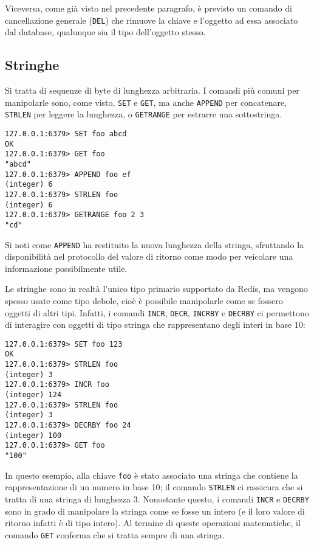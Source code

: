 Viceversa, come già visto nel precedente paragrafo, è previsto un comando di cancellazione
generale (\verb|DEL|) che rimuove la chiave e l'oggetto ad essa associato dal database,
qualunque sia il tipo dell'oggetto stesso.


\subsection{Stringhe}

Si tratta di sequenze di byte di lunghezza arbitraria. I comandi
più comuni per manipolarle sono, come visto, \verb|SET| e \verb|GET|, ma anche \verb|APPEND|
per concatenare, \verb|STRLEN| per leggere la lunghezza, o \verb|GETRANGE| per estrarre una
sottostringa.

\medskip
\begin{lstlisting}
127.0.0.1:6379> SET foo abcd
OK
127.0.0.1:6379> GET foo
"abcd"
127.0.0.1:6379> APPEND foo ef
(integer) 6
127.0.0.1:6379> STRLEN foo
(integer) 6
127.0.0.1:6379> GETRANGE foo 2 3
"cd"
\end{lstlisting}

Si noti come \verb|APPEND| ha restituito la nuova lunghezza della stringa, sfruttando
la disponibilità nel protocollo del valore di ritorno come modo per veicolare una
informazione possibilmente utile.

Le stringhe sono in realtà l'unico tipo primario supportato da Redis, ma vengono spesso usate come
tipo debole, cioè è possibile manipolarle come se fossero oggetti di altri tipi. Infatti, i comandi
\verb|INCR|, \verb|DECR|,  \verb|INCRBY| e \verb|DECRBY| ci permettono di interagire con oggetti di
tipo stringa che rappresentano degli interi in base 10:

\medskip
\begin{lstlisting}
127.0.0.1:6379> SET foo 123
OK
127.0.0.1:6379> STRLEN foo
(integer) 3
127.0.0.1:6379> INCR foo
(integer) 124
127.0.0.1:6379> STRLEN foo
(integer) 3
127.0.0.1:6379> DECRBY foo 24
(integer) 100
127.0.0.1:6379> GET foo
"100"
\end{lstlisting}

In questo esempio, alla chiave \verb|foo| è stato associato una stringa che contiene
la rappresentazione di un numero in base 10; il comando \verb|STRLEN| ci rassicura
che si tratta di una stringa di lunghezza 3. Nonostante questo, i comandi \verb|INCR|
e \verb|DECRBY| sono in grado di manipolare la stringa come se fosse un intero (e il
loro valore di ritorno infatti è di tipo intero). Al termine di queste operazioni
matematiche, il comando \verb|GET| conferma che si tratta sempre di una stringa.

